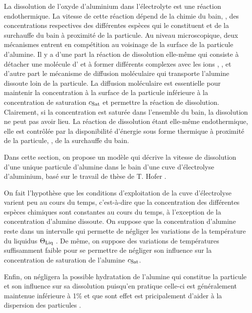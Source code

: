 La dissolution de l'oxyde d'aluminium dans l'électrolyte est une réaction
endothermique. La vitesse de cette réaction dépend de la chimie du
bain, \ie, des concentrations respectives des différentes espèces qui
le constituent et de la surchauffe du bain à proximité de la
particule. Au niveau microscopique, deux mécanismes entrent en
compétition au voisinage de la surface de la particule d'alumine. Il y a
d'une part la réaction de dissolution elle-même qui consiste à
détacher une molécule d' et à former différents complexes
avec les ions  \cite{Haupin1995}, \cite{Kvande1986}, et
d'autre part le mécanisme de diffusion moléculaire qui transporte
l'alumine dissoute loin de la particule. La diffusion moléculaire est
essentielle pour maintenir la concentration à la surface de la
particule inférieure à la concentration de saturation $c_\text{Sat}$ et
permettre la réaction de dissolution. Clairement, si la concentration
est saturée dans l'ensemble du bain, la dissolution ne peut pas avoir
lieu. La réaction de dissolution étant elle-même endothermique, elle
est contrôlée par la disponibilité d'énergie sous forme thermique à
proximité de la particule, \ie, de la surchauffe du bain.

Dans cette section, on propose un modèle qui décrive la vitesse de
dissolution d'une unique particule d'alumine dans le bain d'une cuve
d'électrolyse d'aluminium, basé sur le travail de thèse de T. Hofer
\cite{Hofer2011}.

On fait l'hypothèse que les conditions d'exploitation de la cuve
d'électrolyse varient peu au cours du temps, c'est-à-dire que la
concentration des différentes espèces chimiques sont constantes au
cours du temps, à l'exception de la concentration d'alumine dissoute. On
suppose que la concentration d'alumine reste dans un intervalle qui
permette de négliger les variations de la température du liquidus
$\Theta_\text{Liq}$ \cite{Skybakmoen1997}. De même, on suppose des variations de températures
suffisamment faible pour se permettre de négliger son influence sur
la concentration de saturation de l'alumine $c_\text{Sat}$.

Enfin, on négligera la possible hydratation de l'alumine qui constitue
la particule et son influence sur sa dissolution puisqu'en pratique
celle-ci est généralement maintenue inférieure à \num{1}\% et que sont
effet est pricipalement d'aider à la dispersion des particules
\cite{Fini2017}.

